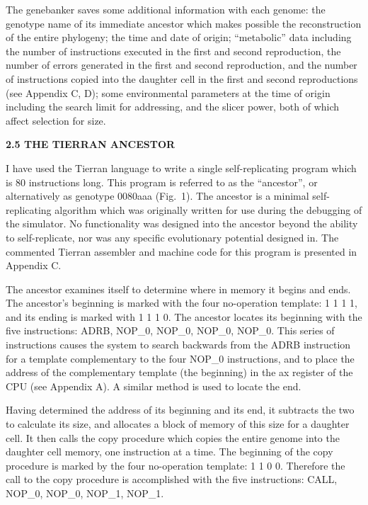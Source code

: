 The genebanker saves some additional information with each genome: the
genotype name of its immediate ancestor which makes possible the
reconstruction of the entire phylogeny; the time and date of origin;
``metabolic'' data including the number of instructions executed in the
first and second reproduction, the number of errors generated in the first
and second reproduction, and the number of instructions copied into the
daughter cell in the first and second reproductions (see Appendix C, D); some
environmental parameters at the time of origin including the search limit
for addressing, and the slicer power, both of which affect selection for size.

\LP
\bf 2.5 THE TIERRAN ANCESTOR\rm
\eLP

I have used the Tierran language to write a single self-replicating program
which is 80 instructions long.  This program is referred to as the
``ancestor'', or alternatively as genotype 0080aaa (Fig.\ 1).  The ancestor
is a minimal self-replicating algorithm which was originally written for use
during the debugging of the simulator.  No functionality was designed into
the ancestor beyond the ability to self-replicate, nor was any specific
evolutionary potential designed in.  The commented Tierran assembler and
machine code for this program is presented in Appendix C.

The ancestor examines itself to determine where in memory it begins and ends.
The ancestor's beginning is marked with the four no-operation template:
1 1 1 1, and its ending is marked with 1 1 1 0.  The ancestor locates its
beginning with the five instructions: ADRB, NOP\_0, NOP\_0, NOP\_0, NOP\_0.
This series of instructions causes the system to search backwards
from the ADRB instruction for a template complementary to the four NOP\_0
instructions, and to place the address of the complementary template
(the beginning) in the ax register of the CPU (see Appendix A).  A similar
method is used to locate the end.

Having determined the address of its beginning and its end, it subtracts
the two to calculate its size, and allocates a block of memory of this size
for a daughter cell.  It then calls the copy procedure which copies the entire
genome into the daughter cell memory, one instruction at a time.
The beginning of the copy procedure is marked by the four no-operation
template: 1 1 0 0.  Therefore the call to the copy procedure is accomplished
with the five instructions: CALL, NOP\_0, NOP\_0, NOP\_1, NOP\_1.

